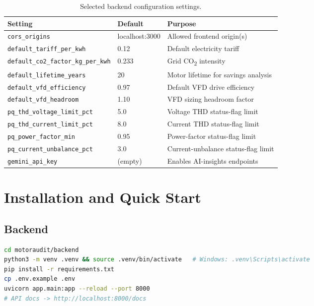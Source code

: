 \documentclass[11pt,a4paper]{article}
\newcommand{\code}[1]{\texttt{#1}}
\begin{document}
\begin{table}[h]
\centering
\small
\begin{tabular}{@{}p{6.2cm}p{2.6cm}p{4.5cm}@{}}
\toprule
\textbf{Setting} & \textbf{Default} & \textbf{Purpose} \\
\midrule
\code{cors\_origins} & localhost:3000 & Allowed frontend origin(s) \\
\code{default\_tariff\_per\_kwh} & 0.12 & Default electricity tariff \\
\code{default\_co2\_factor\_kg\_per\_kwh} & 0.233 & Grid CO\textsubscript{2} intensity \\
\code{default\_lifetime\_years} & 20 & Motor lifetime for savings analysis \\
\code{default\_vfd\_efficiency} & 0.97 & Default VFD drive efficiency \\
\code{default\_vfd\_headroom} & 1.10 & VFD sizing headroom factor \\
\code{pq\_thd\_voltage\_limit\_pct} & 5.0 & Voltage THD status-flag limit \\
\code{pq\_thd\_current\_limit\_pct} & 8.0 & Current THD status-flag limit \\
\code{pq\_power\_factor\_min} & 0.95 & Power-factor status-flag limit \\
\code{pq\_current\_unbalance\_pct} & 3.0 & Current-unbalance status-flag limit \\
\code{gemini\_api\_key} & (empty) & Enables AI-insights endpoints \\
\bottomrule
\end{tabular}
\caption{Selected backend configuration settings.}
\end{table}

\section{Installation and Quick Start}

\subsection{Backend}

\begin{lstlisting}[style=code, language=bash]
cd motoraudit/backend
python3 -m venv .venv && source .venv/bin/activate   # Windows: .venv\Scripts\activate
pip install -r requirements.txt
cp .env.example .env
uvicorn app.main:app --reload --port 8000
# API docs -> http://localhost:8000/docs
\end{lstlisting}
\end{document}
